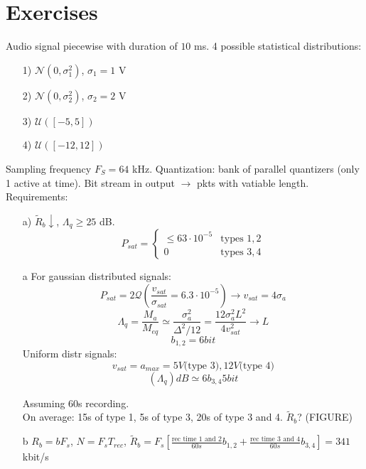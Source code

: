 \section{Exercises}
\begin{exercize}{3}
  Audio signal piecewise with duration of $10$ ms. 4 possible statistical distributions:
          \begin{itemize}
            \item[1)] $\mathcal{N}(0, \sigma_1^2)$, $\sigma_1 = 1$ V
            \item[2)] $\mathcal{N}(0, \sigma_2^2)$, $\sigma_2 = 2$ V
            \item[3)] $\mathcal{U}([-5, 5])$
            \item[4)] $\mathcal{U}([-12, 12])$
          \end{itemize}
          Sampling frequency $F_S = 64$ kHz. Quantization: bank of parallel quantizers (only 1 active at time).  Bit stream in output $\rightarrow$ pkts with vatiable length. Requirements:
          \begin{itemize}
            \item[a)] $\tilde{R}_b \downarrow$, $\Lambda_q \geq 25$ dB.\\
            \begin{equation}
                P_{sat} =
            \begin{cases}
              \leq 63 \cdot 10^{-5} & \textrm{types } 1, 2 \\
              0  & \textrm{types } 3, 4
            \end{cases}
          \end{equation}
          \begin{solution}{a}
            For gaussian distributed signals: $$P_{sat} = 2\mathcal{Q}(\frac{v_{sat}}{\sigma_{sat}} = 6.3 \cdot 10^{-5}) \rightarrow v_{sat} = 4\sigma_a$$
            $$\Lambda_q = \frac{M_a}{M_{eq}} \simeq \frac{\sigma_a^2}{\Delta^2/12} = \frac{12\sigma_a^2L^2}{4v_{sat}^2} \rightarrow L$$
            $$b_{1,2} = 6 bit$$
            Uniform distr signals:
            $$v_{sat} = a_{max} = 5 V \textrm{(type 3)}, 12 V \textrm{(type 4)}$$
            $$(\Lambda_q)dB \simeq 6b_{3,4} 5 bit$$
          \end{solution}

             Assuming 60s recording.\\
            On average: 15s of type 1, 5s of type 3, 20s of type 3 and 4. $\tilde{R}_b$? (FIGURE)
          \begin{solution}{b}
            $R_b = bF_s$, $N = F_s T_{rec}$, $\tilde{R}_b = F_s\left[\frac{\textrm{rec time 1 and 2}}{60s}b_{1,2}+\frac{\textrm{rec time 3 and 4}}{60s}b_{3,4}\right] = 341$ kbit/s
          \end{solution}


\end{itemize}
\end{exercize}
